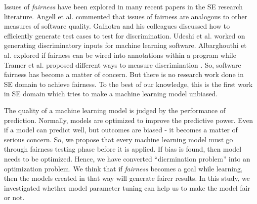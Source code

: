 \documentclass[10pt,conference]{IEEEtran}
\begin{document}

Issues of \textit{fairness} have been explored in many  recent papers in the SE research literature. Angell et al. \cite{Angell:2018:TAT:3236024.3264590}  commented that issues of fairness are analogous to other measures of software quality. Galhotra and his colleagues discussed how to efficiently generate test cases to test for discrimination\cite{Galhotra_2017}. Udeshi et al. \cite{Udeshi_2018} worked on generating discriminatory  inputs for machine learning software. Albarghouthi et al. \cite{Albarghouthi:2019:FP:3287560.3287588} explored if fairness can be wired into annotations within a program while Tramer et al. proposed different ways to measure discrimination \cite{Tramer_2017}. So, software fairness has become a matter of concern. But there is no research work done in SE domain to achieve fairness. To the best of our knowledge, this is the first work in SE domain which tries to make a machine learning model unbiased.

 The quality of a machine learning model is judged by the performance of prediction. Normally, models are optimized to improve the predictive power. Even if a model can predict well, but outcomes are biased - it becomes a matter of serious concern. So, we propose that every machine learning model must go through fairness testing phase before it is applied. If bias is found, then model needs to be optimized. Hence, we have converted ``dicrmination problem'' into an optimization problem. We think that if \textit{fairness} becomes a goal while learning, then the  models created in that way will generate fairer results. In this study, we investigated whether model parameter tuning can help us to make the model fair or not. 
 
\end{document}
